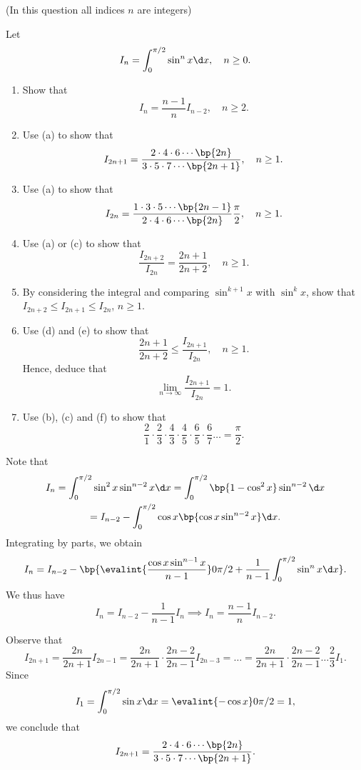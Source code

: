 \begin{problem}
    (In this question all indices $n$ are integers)

    Let \[I_n = \int_0^{\pi/2} \sin^n x \d x, \quad n \geq 0.\]

    \begin{enumerate}
        \item Show that \[I_n = \frac{n-1}{n} I_{n-2}, \quad n \geq 2.\]
        \item Use (a) to show that \[I_{2n+1} = \frac{2 \cdot 4 \cdot 6 \cdots \bp{2n}}{3 \cdot 5 \cdot 7 \cdots \bp{2n+1}}, \quad n \geq 1.\]
        \item Use (a) to show that \[I_{2n} = \frac{1 \cdot 3 \cdot 5 \cdots \bp{2n-1}}{2 \cdot 4 \cdot 6 \cdots \bp{2n}} \frac\pi2, \quad n \geq 1.\]
        \item Use (a) or (c) to show that \[\frac{I_{2n+2}}{I_{2n}} = \frac{2n+1}{2n+2}, \quad n \geq 1.\]
        \item By considering the integral and comparing $\sin^{k+1} x$ with $\sin^k x$, show that $I_{2n+2} \leq I_{2n+1} \leq I_{2n}$, $n \geq 1.$
        \item Use (d) and (e) to show that \[\frac{2n+1}{2n+2} \leq \frac{I_{2n+1}}{I_{2n}}, \quad n \geq 1.\] Hence, deduce that \[\lim_{n \to \infty} \frac{I_{2n+1}}{I_{2n}} = 1.\]
        \item Use (b), (c) and (f) to show that \[\frac21 \cdot \frac23 \cdot \frac43 \cdot \frac45 \cdot \frac65 \cdot \frac67 \dots = \frac\pi2.\]
    \end{enumerate}
\end{problem}\begin{solution}
    \begin{ppart}
        Note that
        \begin{gather*}
            I_n = \int_{0}^{\pi/2} \sin^2 x \sin^{n-2} x \d x = \int_0^{\pi/2} \bp{1 - \cos^2 x} \sin^{n-2} \d x \\
            = I_{n-2} - \int_0^{\pi/2} \cos x \bp{\cos x \sin^{n-2} x} \d x.
        \end{gather*}
        Integrating by parts, we obtain \[I_n = I_{n-2} - \bp{\evalint{\frac{\cos x \sin^{n-1} x}{n-1}}0{\pi/2} + \frac1{n-1} \int_0^{\pi/2} \sin^{n} x \d x}.\] We thus have \[I_n = I_{n-2} - \frac1{n-1} I_n \implies I_n = \frac{n-1}{n} I_{n-2}.\]
    \end{ppart}
    \begin{ppart}
        Observe that \[I_{2n+1} = \frac{2n}{2n+1} I_{2n-1} = \frac{2n}{2n+1} \cdot \frac{2n-2}{2n-1} I_{2n-3} = \dots = \frac{2n}{2n+1} \cdot \frac{2n-2}{2n-1} \dots \frac{2}{3} I_1.\] Since \[I_1 = \int_0^{\pi/2} \sin x \d x = \evalint{-\cos x}0{\pi/2} = 1,\] we conclude that \[I_{2n+1} = \frac{2 \cdot 4 \cdot 6 \cdots \bp{2n}}{3 \cdot 5 \cdot 7 \cdots \bp{2n+1}}.\]

\end{ppart}
\end{solution}
